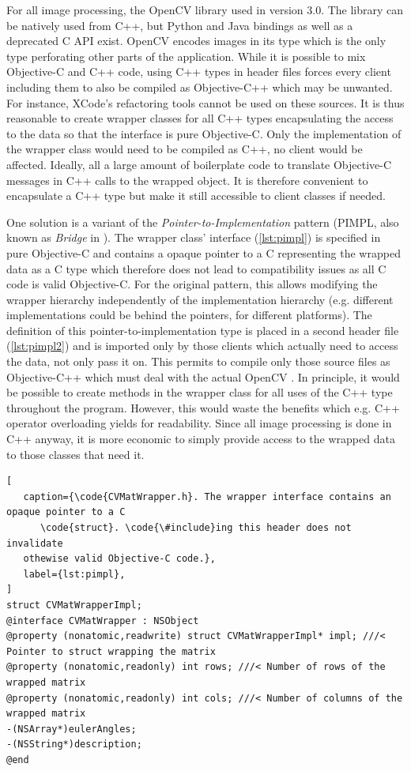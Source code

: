 For all image processing, the OpenCV library used in version 3.0. The library
can be natively used from C++, but Python and Java bindings as well as a
deprecated C API exist. OpenCV encodes images in its  type which is
the only type perforating other parts of the application.  While it is possible
to mix Objective-C and C++ code, using C++ types in header files forces every
client including them to also be compiled as Objective-C++ which may be
unwanted. For instance, XCode's refactoring tools cannot be used on these
sources. It is thus reasonable to create wrapper classes for all C++ types
encapsulating the access to the data so that the interface is pure Objective-C.
Only the implementation of the wrapper class would need to be compiled as C++,
no client would be affected. Ideally, all a large amount of boilerplate code to
translate Objective-C messages in C++ calls to the wrapped object.  It is
therefore convenient to encapsulate a C++ type but make it still accessible to
client classes if needed. 

One solution is a variant of the \emph{Pointer-to-Implementation} pattern
(PIMPL, also known as \emph{Bridge} in \citep{gamma1995}). The wrapper class'
interface (\autoref{lst:pimpl}) is specified in pure Objective-C and contains a
opaque pointer to a C  representing the wrapped data as a C type
which therefore does not lead to compatibility issues as all C code is valid
Objective-C. For the original pattern, this allows modifying the wrapper
hierarchy independently of the implementation hierarchy (e.g. different
implementations could be behind the pointers, for different platforms). The
definition of this pointer-to-implementation type is placed in a second header
file (\autoref{lst:pimpl2}) and is imported only by those clients which actually
need to access the data, not only pass it on. This permits to compile only those
source files as Objective-C++ which must deal with the actual OpenCV .
In principle, it would be possible to create methods in the wrapper class for
all uses of the C++ type throughout the program. However, this would waste the
benefits which e.g. C++ operator overloading yields for readability. Since all
image processing is done in C++ anyway, it is more economic to simply provide
access to the wrapped data to those classes that need it.

\lstset{
   language=[Objective]C,
   float,
}

\begin{lstlisting}[
   caption={\code{CVMatWrapper.h}. The wrapper interface contains an opaque pointer to a C
      \code{struct}. \code{\#include}ing this header does not invalidate
   othewise valid Objective-C code.},
   label={lst:pimpl},
]
struct CVMatWrapperImpl;
@interface CVMatWrapper : NSObject
@property (nonatomic,readwrite) struct CVMatWrapperImpl* impl; ///< Pointer to struct wrapping the matrix
@property (nonatomic,readonly) int rows; ///< Number of rows of the wrapped matrix
@property (nonatomic,readonly) int cols; ///< Number of columns of the wrapped matrix
-(NSArray*)eulerAngles;
-(NSString*)description;
@end
\end{lstlisting}

